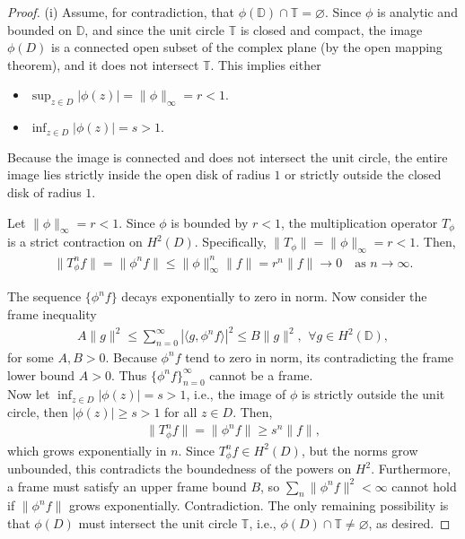 \documentclass[12pt,titlepage]{amsart}
\theoremstyle{definition}
\theoremstyle{remark}
\begin{document}
\begin{proof}
(i) Assume, for contradiction, that $\phi(\mathbb{D})\cap
\mathbb{T} = \varnothing$. Since $\phi$ is analytic and bounded on
$\mathbb{D}$, and since the unit circle $\mathbb{T}$ is closed and
compact, the image $\phi(D)$ is a connected open subset of the
complex plane (by the open mapping theorem), and it does not
intersect $\mathbb{T}$. This implies either
\begin{itemize}
\item[(a)] $\sup_{z \in D} |\phi(z)| = \|\phi\|_\infty = r < 1$.
\item[(b)] $\inf_{z \in D} |\phi(z)| = s > 1$.
\end{itemize}
Because the image is connected and does not intersect the unit
circle, the entire image lies strictly inside the open disk of
radius $1$ or strictly outside the closed disk of radius $1$.

Let $\|\phi\|_\infty = r < 1$. Since $\phi$ is bounded by $r < 1$,
the multiplication operator $T_\phi$ is a strict contraction on
$H^2(D)$. Specifically, $\|T_\phi\| = \|\phi\|_\infty = r < 1$.
Then,
\begin{eqnarray*}
\|T_\phi^n f\| = \|\phi^n f\| \leq \|\phi\|_\infty^n \|f\| = r^n
\|f\| \to 0 \quad \text{as } n \to \infty.
\end{eqnarray*}

The sequence $\{\phi^n f\}$ decays exponentially to zero in norm.
Now consider the frame inequality
\begin{eqnarray*}
A \|g\|^2 \leq \sum_{n=0}^\infty |\langle g, \phi^n f \rangle|^2
\leq B \|g\|^2, \,\ \forall g \in H^2(\mathbb{D}),
\end{eqnarray*}
for some $A, B > 0$. Because $\phi^n f$ tend to zero in norm, its
contradicting the frame lower bound $A > 0$.  Thus $\{\phi^n
f\}_{n=0}^\infty$ cannot be a frame.\\ Now let $\inf_{z \in D}
|\phi(z)| = s > 1$, i.e., the image of $\phi$ is strictly outside
the unit circle, then $|\phi(z)| \geq s > 1$ for all $z \in D$.
Then,
\begin{eqnarray*}
\|T_\phi^n f\| = \|\phi^n f\| \geq s^n \|f\|,
\end{eqnarray*}
which grows exponentially in $n$. Since $T_\phi^n f \in H^2(D)$,
but the norms grow unbounded, this contradicts the boundedness of
the powers on $H^2$. Furthermore, a frame must satisfy an upper
frame bound $B$, so $\sum_n \|\phi^n f\|^2 < \infty$ cannot hold
if $\|\phi^n f\|$ grows exponentially. Contradiction. The only
remaining possibility is that $\phi(D)$ must intersect the unit
circle $\mathbb{T}$, i.e., $\phi(D) \cap \mathbb{T} \neq
\varnothing$, as desired.


\end{proof}
\end{document}
